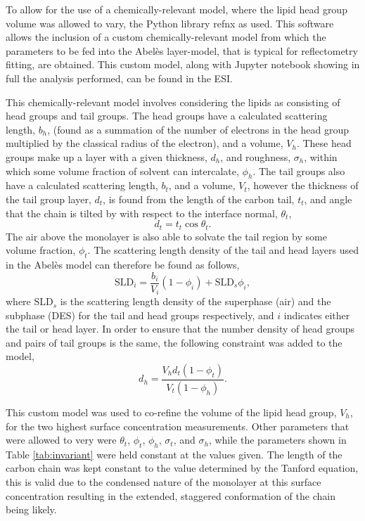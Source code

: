 \documentclass[twoside,twocolumn,9pt]{article}
\begin{document}
To allow for the use of a chemically-relevant model, where the lipid head group volume was allowed to vary, the Python library refnx\cite{Nelson2018} as used. This software allows the inclusion of a custom chemically-relevant model from which the parameters to be fed into the Abel\`{e}s layer-model,\cite{Abeles1950,Parratt1954} that is typical for reflectometry fitting, are obtained. This custom model, along with Jupyter notebook showing in full the analysis performed, can be found in the ESI. 

This chemically-relevant model involves considering the lipids as consisting of head groups and tail groups. The head groups have a calculated scattering length, $b_h$, (found as a summation of the number of electrons in the head group multiplied by the classical radius of the electron), and a volume, $V_h$. These head groups make up a layer with a given thickness, $d_h$, and roughness, $\sigma_h$, within which some volume fraction of solvent can intercalate, $\phi_h$. The tail groups also have a calculated scattering length, $b_t$, and a volume, $V_t$, however the thickness of the tail group layer, $d_t$, is found from the length of the carbon tail, $t_t$, and angle that the chain is tilted by with respect to the interface normal, $\theta_t$, 
\begin{equation}
\label{equ:tl}
d_t = t_t \cos{\theta_t}.
\end{equation}
The air above the monolayer is also able to solvate the tail region by some volume fraction, $\phi_t$. The scattering length density of the tail and head layers used in the Abel\`{e}s model can therefore be found as follows, 
\begin{equation}
\text{SLD}_i = \frac{b_i}{V_i}(1 - \phi_i) + \text{SLD}_{s}\phi_i,
\end{equation}
where $\text{SLD}_{s}$ is the scattering length density of the superphase (air) and the subphase (DES) for the tail and head groups respectively, and $i$ indicates either the tail or head layer. In order to ensure that the number density of head groups and pairs of tail groups is the same, the following constraint was added to the model,
\begin{equation}
\label{equ:ht}
d_h = \frac{V_hd_t(1-\phi_t)}{V_t(1-\phi_h)}. 
\end{equation}

This custom model was used to co-refine the volume of the lipid head group, $V_h$, for the two highest surface concentration measurements. Other parameters that were allowed to very were $\theta_t$, $\phi_t$, $\phi_h$, $\sigma_t$, and $\sigma_h$, while the parameters shown in Table \ref{tab:invariant} were held constant at the values given. The length of the carbon chain was kept constant to the value determined by the Tanford equation,\cite{Tanford1980} this is valid due to the condensed nature of the monolayer at this surface concentration resulting in the extended, staggered conformation of the chain being likely. 
\end{document}
